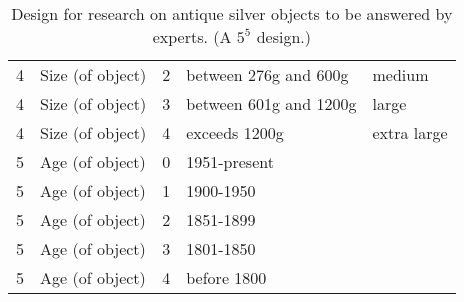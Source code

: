 \documentclass[article, crop=false]{standalone}
\begin{document}
\begin{table}[!hb]
\begin{tabular}{@{}clcll@{}}
4 & Size (of object)     & 2 & between 276g and 600g      & medium               \\
4 & Size (of object)     & 3 & between 601g and 1200g     & large                \\
4 & Size (of object)     & 4 & exceeds 1200g              & extra large          \\
5 & Age (of object)      & 0 & 1951-present &                  \\
5 & Age (of object)      & 1 & 1900-1950 &                     \\
5 & Age (of object)      & 2 & 1851-1899 &                    \\
5 & Age (of object)      & 3 & 1801-1850 &                     \\
5 & Age (of object)      & 4 & before 1800 &
\\ \bottomrule
\end{tabular}
\caption{Design for research on antique silver objects to be answered by experts. (A $5^5$ design.)}
\label{tab:design-ordered-silver}
\end{table}
\end{document}
